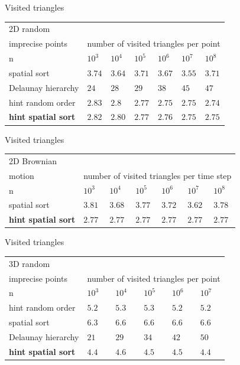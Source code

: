 \documentclass{beamer}
\begin{document}
\begin{frame}{Visited triangles}
\begin{tabular}{|l||l|l|l|l|l|l|}
\hline
2D random \\
imprecise points & \multicolumn{6}{|c|}{number of visited triangles per point}\\
 \hline \hline
    n & $10^3$ & $10^4$ & $10^5$ & $10^6$ & $10^7$ & $10^8$\\\hline
    spatial sort & $3.74$ & $3.64 $ & $3.71 $ & $3.67 $ & $3.55 $ & $3.71$\\\hline
    Delaunay hierarchy & $24$ & $28$ & $29$ & $38$ & $45$ & $47$\\\hline
    hint random order & $2.83 $ & $2.8 $ & $2.77 $ & $2.75 $ & $2.75$ & $2.74$\\\hline
    \textbf{hint spatial sort} & $2.82$ & $2.80$ & $2.77$ & $2.76$ & $2.75$ & $2.75$\\\hline
\end{tabular}
\end{frame}

\begin{frame}{Visited triangles}
\begin{tabular}{|l||l|l|l|l|l|l|}
\hline
2D Brownian \\
motion & \multicolumn{6}{|c|}{number of visited triangles per time step}\\
 \hline \hline
    n & $10^3$ & $10^4$ & $10^5$ & $10^6$ & $10^7$ & $10^8$\\\hline
    spatial sort & $3.81$ & $3.68 $ & $3.77 $ & $3.72 $ & $3.62 $ & $3.78$\\\hline
    \textbf{hint spatial sort} & $2.77$ & $2.77$ & $2.77$ & $2.77$ & $2.77$ & $2.77$\\\hline
\end{tabular}
\end{frame}

\begin{frame}{Visited triangles}
\begin{tabular}{|l||l|l|l|l|l|}
\hline
3D random \\
imprecise points & \multicolumn{5}{|c|}{number of visited triangles per point}\\
 \hline \hline
    n & $10^3$ & $10^4$ & $10^5$ & $10^6$ & $10^7$ \\\hline
    hint random order & $5.2 $ & $5.3 $ & $5.3$ & $5.2$ & $5.2$\\\hline
    spatial sort & $6.3$ & $6.6$ & $6.6$ & $6.6$ & $6.6$ \\\hline
    Delaunay hierarchy & $21$ & $29$ & $34$ & $42$ & $50$\\\hline
    \textbf{hint spatial sort} & $4.4$ & $4.6$ & $4.5$ & $4.5$ & $4.4$\\\hline
\end{tabular}
\end{frame}
\end{document}
